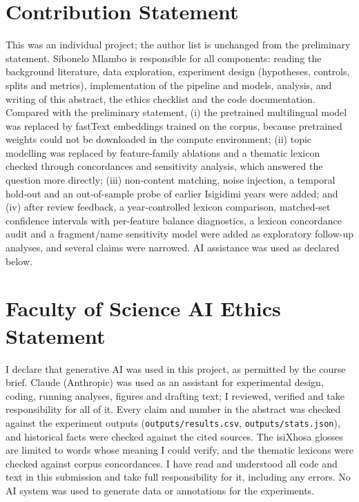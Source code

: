 \documentclass[10pt,letterpaper]{article}
\begin{document}
\section{Contribution Statement}
This was an individual project; the author list is unchanged from the preliminary statement. Sibonelo Mlambo is responsible for all components: reading the background literature, data exploration, experiment design (hypotheses, controls, splits and metrics), implementation of the pipeline and models, analysis, and writing of this abstract, the ethics checklist and the code documentation. Compared with the preliminary statement, (i) the pretrained multilingual model was replaced by fastText embeddings trained on the corpus, because pretrained weights could not be downloaded in the compute environment; (ii) topic modelling was replaced by feature-family ablations and a thematic lexicon checked through concordances and sensitivity analysis, which answered the question more directly; (iii) non-content matching, noise injection, a temporal hold-out and an out-of-sample probe of earlier Isigidimi years were added; and (iv) after review feedback, a year-controlled lexicon comparison, matched-set confidence intervals with per-feature balance diagnostics, a lexicon concordance audit and a fragment/name sensitivity model were added as exploratory follow-up analyses, and several claims were narrowed. AI assistance was used as declared below.

\section{Faculty of Science AI Ethics Statement}
I declare that generative AI was used in this project, as permitted by the course brief. Claude (Anthropic) was used as an assistant for experimental design, coding, running analyses, figures and drafting text; I reviewed, verified and take responsibility for all of it. Every claim and number in the abstract was checked against the experiment outputs (\texttt{outputs/results.csv}, \texttt{outputs/stats.json}), and historical facts were checked against the cited sources. The isiXhosa glosses are limited to words whose meaning I could verify, and the thematic lexicons were checked against corpus concordances. I have read and understood all code and text in this submission and take full responsibility for it, including any errors. No AI system was used to generate data or annotations for the experiments.


\setlength{\bibleftmargin}{.125in}
\setlength{\bibindent}{-\bibleftmargin}

\end{document}
